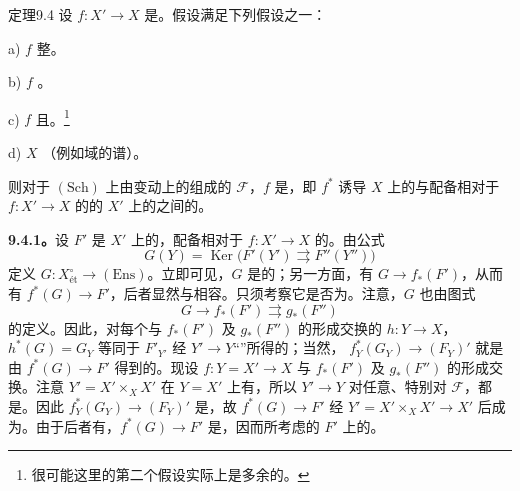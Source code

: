 \begin{SGAresult}{定理}{9.4}
设 $f:X'\to X$ 是。假设满足下列假设之一：
\par a) $f$ 整。
\par b) $f$ 。
\par c) $f$ 且。\footnote{很可能这里的第二个假设实际上是多余的。}
\par d) $X$ （例如域的谱）。
\par 则对于 $(\mathrm{Sch})$ 上由变动上的组成的 $\mathscr F$，$f$ 是，即 $f^*$ 诱导 $X$ 上的与配备相对于 $f:X'\to X$ 的的 $X'$ 上的之间的。
\end{SGAresult}
\textbf{9.4.1。}设 $F'$ 是 $X'$ 上的，配备相对于 $f:X'\to X$ 的。由公式
\[G(Y)=\operatorname{Ker}\bigl(F'(Y')\rightrightarrows F''(Y'')\bigr)\]
定义 $G:X_{\text{ét}}^\circ\to(\mathrm{Ens})$。立即可见，$G$ 是的；另一方面，有 $G\to f_*(F')$，从而有 $f^*(G)\to F'$，后者显然与相容。只须考察它是否为。注意，$G$ 也由图式
\[G\longrightarrow f_*(F')\rightrightarrows g_*(F'')\]
的定义。因此，对每个与 $f_*(F')$ 及 $g_*(F'')$ 的形成交换的 $h:Y\to X$，$h^*(G)=G_Y$ 等同于 $F'_{Y'}$ 经 $Y'\to Y$“”所得的；当然， $f_Y^*(G_Y)\to(F_Y)'$ 就是由 $f^*(G)\to F'$ 得到的。现设 $f:Y=X'\to X$ 与 $f_*(F')$ 及 $g_*(F'')$ 的形成交换。注意 $Y'=X'\times_X X'$ 在 $Y=X'$ 上有，所以 $Y'\to Y$ 对任意、特别对 $\mathscr F$，都是。因此 $f_Y^*(G_Y)\to(F_Y)'$ 是，故 $f^*(G)\to F'$ 经 $Y'=X'\times_X X'\to X'$ 后成为。由于后者有，$f^*(G)\to F'$ 是，因而所考虑的 $F'$ 上的。
